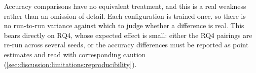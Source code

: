 Accuracy comparisons have no equivalent treatment, and this is a real weakness rather than
an omission of detail. Each configuration is trained once, so there is no run-to-run
variance against which to judge whether a difference is real. This bears directly on RQ4,
whose expected effect is small: either the RQ4 pairings are re-run across several seeds, or
the accuracy differences must be reported as point estimates and read with corresponding
caution (\ref{sec:discussion:limitations:reproducibility}).
